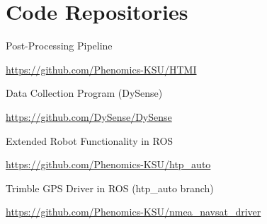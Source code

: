 
\cleardoublepage

\chapter{Code Repositories}
\label{appendix:code_repositories}

\noindent \large Post-Processing Pipeline 

\noindent \url{https://github.com/Phenomics-KSU/HTMI}

\vspace{5mm}

\noindent \large Data Collection Program (DySense)

\noindent \url{https://github.com/DySense/DySense}

\vspace{5mm}

\noindent \large Extended Robot Functionality in ROS 

\noindent \url{https://github.com/Phenomics-KSU/htp_auto}

\vspace{5mm}

\noindent \large Trimble GPS Driver in ROS (htp\_auto branch)

\noindent \url{https://github.com/Phenomics-KSU/nmea_navsat_driver}

